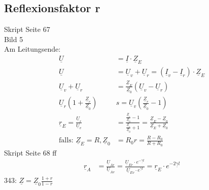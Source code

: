 \subsection{Reflexionsfaktor r}
Skript Seite 67\\
Bild 5\\
Am Leitungsende:\\
\begin{align}
	\underline{U}&=\underline{I}\cdot\underline{Z}_E\nonumber\\
	\underline{U}&=\underline{U}_v+\underline{U}_r=\left(\underline{I}_v-\underline{I}_r\right)\cdot\underline{Z}_E\nonumber\\
	\underline{U}_v+\underline{U}_r&=\frac{\underline{Z}_E}{\underline{Z}_0}\left(\underline{U}_v-\underline{U}_r\right)\nonumber\\
	\underline{U}_r\left(1+\frac{\underline{Z}_e}{\underline{Z}_0}\right)&s=\underline{U}_v\left(\frac{\underline{Z}_e}{\underline{Z}_0}-1\right)\nonumber\\
	\underline{r}_E=\frac{\underline{U}_r}{\underline{U}_v}&=\frac{\frac{\underline{Z}_e}{\underline{Z}_0}-1}{\frac{\underline{Z}_e}{\underline{Z}_0}+1}=\frac{\underline{Z}_E-\underline{Z}_0}{\underline{Z}_E+\underline{Z}_0}\nonumber\\
	\text{falls: }\underline{Z}_E=R, \underline{Z}_0&=R_0
	\boxed{r=\frac{R-R_0}{R+R_0}}\nonumber
\end{align}
Skript Seite 68 ff\\
\begin{align}
	\underline{r}_A&=\frac{\underline{U}_{Ar}}{\underline{U}_{Av}}=\frac{\underline{U}_{Er}\cdot
	e^{-\underline{\gamma}  l}}{\underline{U}_{Ev}\cdot e^{\underline{\gamma}
	l}}=\boxed{\underline{r}_E\cdot e^{-2\underline{\gamma}l}}\nonumber
\end{align}
343: $\underline{Z}=\underline{Z}_0\frac{1+r}{1-r}$
